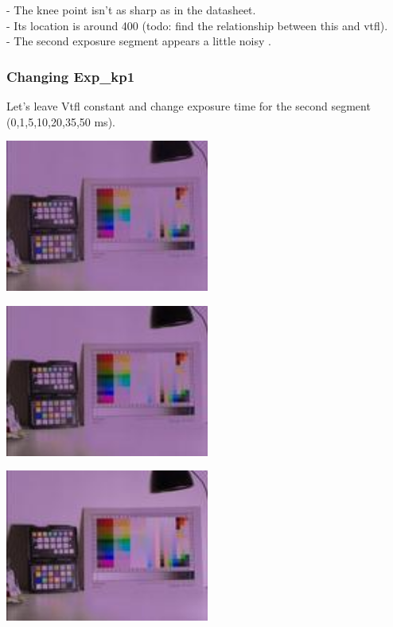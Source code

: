 {- The knee point isn't as sharp as in the datasheet.\\
- Its location is around 400 (todo: find the relationship between this and vtfl).\\
- The second exposure segment appears a little noisy .\\

\subsubsection{Changing Exp\_kp1}

Let's leave Vtfl constant and change exposure time for the second segment (0,1,5,10,20,35,50 ms). 

\begin{center}
\includegraphics[height=5cm]{images/100ms-0ms-32-tiny}
\end{center}

\begin{center}
\includegraphics[height=5cm]{images/100ms-1ms-32-tiny}
\end{center}

\begin{center}
\includegraphics[height=5cm]{images/100ms-5ms-32-tiny}
\end{center}

}
